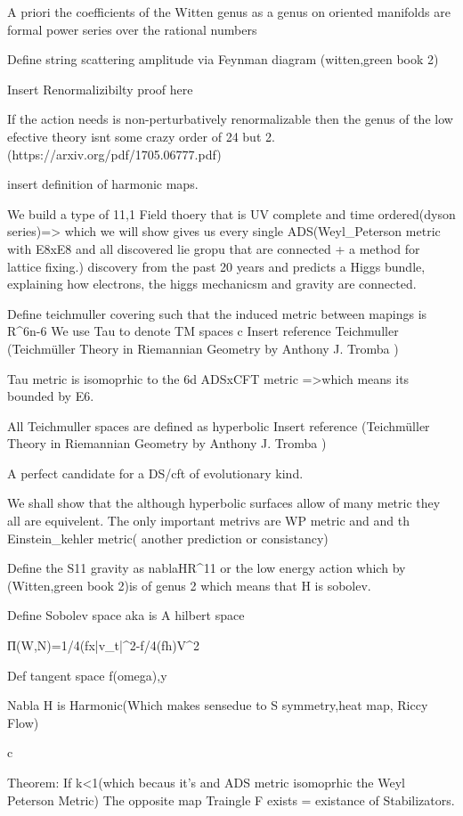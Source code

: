 A priori the coefficients of the Witten genus as a genus on oriented manifolds are formal power series over the rational numbers


Define string scattering amplitude via Feynman diagram (witten,green book 2)

Insert Renormalizibilty proof here

If the action needs is non-perturbatively 
renormalizable then the genus of the low efective theory isnt some crazy order of 24 but 2.
(https://arxiv.org/pdf/1705.06777.pdf)

insert definition of harmonic maps.

We build a type of 11,1 Field thoery that is UV complete and time ordered(dyson series)=> 
which we will show gives us every single ADS(Weyl_Peterson metric with E8xE8 and all discovered lie gropu that are connected + a method for lattice fixing.)
discovery from the past 20 years and predicts a Higgs bundle, explaining how electrons, the higgs mechanicsm and gravity are connected.


Define teichmuller covering such that the induced metric between mapings
 is R^6n-6 We use Tau to denote TM spaces 
c
Insert reference Teichmuller (Teichmüller Theory in Riemannian Geometry by Anthony J. Tromba )

Tau metric is isomoprhic to the 6d ADSxCFT metric =>which means its bounded by E6.

All Teichmuller spaces are defined as hyperbolic Insert reference (Teichmüller Theory in Riemannian Geometry by Anthony J. Tromba )

A perfect candidate for a DS/cft of evolutionary kind.

We shall show that the although hyperbolic surfaces allow of many metric they all are equivelent.
The only important metrivs are WP metric and and th Einstein_kehler metric( another prediction or consistancy)

Define the S11 gravity as nablaHR^11 or the low energy action which by (Witten,green book 2)is of genus 2 which means that H is sobolev.



Define Sobolev space aka is A hilbert space

П(W,N)=1/4(fx|v_t|^2-f/4(fh)V^2

Def tangent space f(omega),y

Nabla H is Harmonic(Which makes sensedue to S symmetry,heat map, Riccy Flow)

c

Theorem: If k<1(which becaus it's and ADS metric isomoprhic the Weyl Peterson Metric) The opposite map  Traingle F  exists = existance of Stabilizators.

